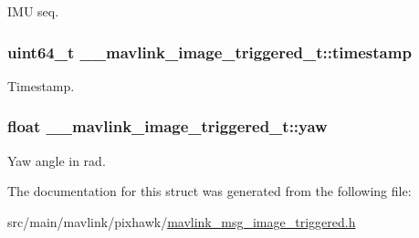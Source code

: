 I\+M\+U seq. 

\hypertarget{struct____mavlink__image__triggered__t_a0c6f8978d3472905eaefdd5ac764f18a}{
\subsubsection[{timestamp}]{\setlength{\rightskip}{0pt plus 5cm}uint64\+\_\+t \+\_\+\+\_\+mavlink\+\_\+image\+\_\+triggered\+\_\+t\+::timestamp}}\label{struct____mavlink__image__triggered__t_a0c6f8978d3472905eaefdd5ac764f18a}


Timestamp. 

\hypertarget{struct____mavlink__image__triggered__t_a9f7c41e8245718ab4d548dfc9042a676}{
\subsubsection[{yaw}]{\setlength{\rightskip}{0pt plus 5cm}float \+\_\+\+\_\+mavlink\+\_\+image\+\_\+triggered\+\_\+t\+::yaw}}\label{struct____mavlink__image__triggered__t_a9f7c41e8245718ab4d548dfc9042a676}


Yaw angle in rad. 



The documentation for this struct was generated from the following file\+:\begin{DoxyCompactItemize}
\item 
src/main/mavlink/pixhawk/\hyperlink{mavlink__msg__image__triggered_8h}{mavlink\+\_\+msg\+\_\+image\+\_\+triggered.\+h}\end{DoxyCompactItemize}
